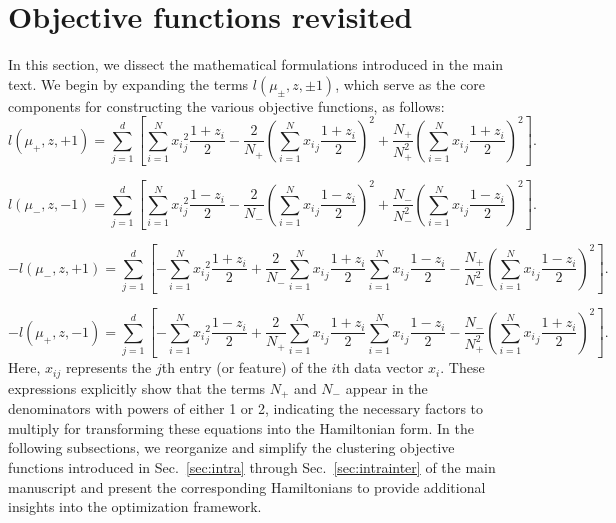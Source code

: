 \documentclass[showpacs,twocolumn,superscriptaddress]{revtex4-2}
\begin{document}
\clearpage
\appendix
\onecolumngrid
\section{Objective functions revisited}
\label{sec:Appendix_A}

In this section, we dissect the mathematical formulations introduced in the main text. We begin by expanding the terms $l(\mu_{\pm},z,\pm 1)$, which serve as the core components for constructing the various objective functions, as follows:
\begin{equation}\label{1st_term_raw}
        l(\mu_+,z,+1) = \sum_{j=1}^d \left[\sum_{i=1}^{N} {x_i}_j^2 \frac{1+z_i}{2} - \frac{2}{N_+} \left(\sum_{i=1}^N {x_i}_j \frac{1+z_i}{2}\right)^2 + \frac{N_+}{N_+^2}\left(\sum_{i=1}^N {x_i}_j \frac{1+z_i}{2}\right)^2 \right].
    \end{equation}

\begin{equation}\label{2nd_term_raw}
    l(\mu_-,z,-1)
    = \sum_{j=1}^d \left[\sum_{i=1}^{N} {x_i}_j^2 \frac{1-z_i}{2} - \frac{2}{N_-} \left(\sum_{i=1}^N {x_i}_j \frac{1-z_i}{2}\right)^2 + \frac{N_-}{N_-^2}\left(\sum_{i=1}^N {x_i}_j \frac{1-z_i}{2}\right)^2 \right].
\end{equation}

\begin{equation}\label{3rd_term_raw}
    - l(\mu_-,z,+1)
    =\sum_{j=1}^d\left[-\sum_{i=1}^{N}{{x_i}_j^2 \frac{1+z_i}{2}} + \frac{2}{N_-}{\sum_{i=1}^{N}{x_i}_j \frac{1+z_i}{2}}{\sum_{i=1}^{N}{x_i}_j \frac{1-z_i}{2}} - \frac{N_+}{N_-^2}\left(\sum_{i=1}^{N}{x_i}_j \frac{1-z_i}{2}\right)^2\right].
\end{equation}

\begin{equation}\label{4th_term_raw}
    - l(\mu_+,z,-1)
    =\sum_{j=1}^d\left[-\sum_{i=1}^{N}{{x_i}_j^2 \frac{1-z_i}{2}} + \frac{2}{N_+}{\sum_{i=1}^{N}{x_i}_j \frac{1+z_i}{2}}{\sum_{i=1}^{N}{x_i}_j \frac{1-z_i}{2}} - \frac{N_-}{N_+^2}\left(\sum_{i=1}^{N}{x_i}_j \frac{1+z_i}{2}\right)^2\right].
\end{equation}
Here, $x_{ij}$ represents the $j$th entry (or feature) of the $i$th data vector $x_i$. These expressions explicitly show that the terms $N_+$ and $N_-$ appear in the denominators with powers of either 1 or 2, indicating the necessary factors to multiply for transforming these equations into the Hamiltonian form.
In the following subsections, we reorganize and simplify the clustering objective functions introduced in Sec.~\ref{sec:intra} through Sec.~\ref{sec:intrainter} of the main manuscript and present the corresponding Hamiltonians to provide additional insights into the optimization framework.
\end{document}
